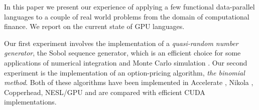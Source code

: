 \documentclass[preprint]{sigplanconf}
\begin{document}
In this paper we present our experience of applying a few functional
data-parallel languages to a couple of real world problems from the
domain of computational finance. We report on the current state of GPU
languages.

Our first experiment involves the implementation of a
\emph{quasi-random number generator}, the Sobol sequence generator,
which is an efficient choice for some applications of numerical
integration and Monte Carlo simulation . Our second experiment is the
implementation of an option-pricing algorithm, \emph{the binomial
  method}. Both of these algorithms have been implemented in
Accelerate \cite{chakravarty2011accelerating}, Nikola
\cite{mainland2010nikola}, Copperhead, NESL/GPU and are compared with
efficient CUDA implementations.

\end{document}
